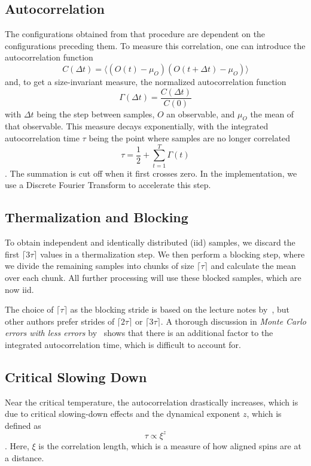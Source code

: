 	\subsection{Autocorrelation}
		The configurations obtained from that procedure are dependent on the configurations preceding them.  To measure this correlation, one can introduce the autocorrelation function
		\begin{equation}
			C(\Delta t) = \langle(O(t) - \mu_O)(O(t + \Delta t) - \mu_O) \rangle
		\end{equation}
		\cite[eq. 41]{bootstrap} and, to get a size-invariant measure, the normalized autocorrelation function
		\begin{equation}
			\Gamma(\Delta t) = \frac{C(\Delta t)}{C(0)}
		\end{equation}
		\cite[eq. 43]{bootstrap} with $\Delta t$ being the step between samples, $O$ an observable, and $\mu_O$ the mean of that observable. This measure decays exponentially, with the integrated autocorrelation time $\tau$ being the point where samples are no longer correlated
		\begin{equation}
			\tau = \frac{1}{2} + \sum^{T}_{t=1}{\Gamma(t)}
		\end{equation}
		\cite[eq. 46]{bootstrap}. The summation is cut off when it first crosses zero. In the implementation, we use a Discrete Fourier Transform to accelerate this step.
		
	\subsection{Thermalization and Blocking}\label{sec:blocking}
		To obtain independent and identically distributed (iid) samples, we discard the first $\lceil 3\tau \rceil$ values in a thermalization step. We then perform a blocking step, where we divide the remaining samples into chunks of size $\lceil \tau \rceil$ and calculate the mean over each chunk. All further processing will use these blocked samples, which are now iid.
		
		The choice of $\lceil \tau \rceil$ as the blocking stride is based on the lecture notes by~\citet{bootstrap}, but other authors prefer strides of $\lceil 2\tau \rceil$ or $\lceil 3\tau \rceil$. A thorough discussion in \emph{Monte Carlo errors with less errors} by~\citet{monte_carlo_errors} shows that there is an additional factor to the integrated autocorrelation time, which is difficult to account for.
		
	\subsection{Critical Slowing Down}\label{sec:theo:critical_slowing_down}
		Near the critical temperature, the autocorrelation drastically increases, which is due to critical slowing-down effects and the dynamical exponent $z$, which is defined as
		\begin{equation}
			\tau \propto \xi^z
		\end{equation}
		\cite[eq. 6]{bootstrap}. Here, $\xi$ is the correlation length, which is a measure of how aligned spins are at a distance.
		
